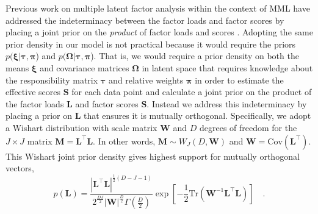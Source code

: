 \documentclass[twocolumn]{aastex62}
\newcommand{\todo}[1]{\textcolor{red}{#1}}
\newcommand{\vect}[1]{\boldsymbol{\mathbf{#1}}}
\renewcommand{\vec}[1]{\vect{#1}}
\newcommand{\weight}{\pi}
\newcommand{\data}{\textbf{Y}}
\newcommand{\vecdata}{\vec\data}
\newcommand{\diag}[1]{\textrm{diag}(#1)}
\newcommand{\transpose}{^\intercal}
\newcommand{\factorloads}{\textbf{L}}
\newcommand{\factorscores}{\textbf{S}}
\newcommand{\specificvariance}{\vec{D}}
\newcommand{\scoremeans}{\vec\xi}
\newcommand{\scorecovs}{\vec\Omega}
\newcommand{\NumDimensions}{D}
\newcommand{\NumLatentFactors}{J}
\newcommand{\likelihood}{\mathcal{L}}
\begin{document}
Previous work on multiple latent factor analysis within the context of MML have
addressed the indeterminacy between the factor loads and factor scores by
placing a joint prior on the \emph{product} of factor loads and scores \citep{WallaceMLF}.
Adopting the same prior density in our model is not practical because 
it would require the priors $p(\scoremeans|\vec\tau,\vec\weight$) and $p(\scorecovs|\vec\tau,\vec\weight$).
That is, we would require a prior density on both the means $\scoremeans$
and covariance matrices $\scorecovs$ in latent space that requires knowledge
about the responsibility matrix $\vec\tau$ and relative weights $\vec\weight$ in order to estimate the effective scores
$\factorscores$ for each data point and calculate a joint prior on the product
of the factor loads $\factorloads$ and factor scores $\factorscores$.
Instead we address this indeterminacy
by placing a prior on $\factorloads$ that ensures it is mutually orthogonal.
Specifically, we adopt a Wishart distribution with scale matrix $\vec{W}$
and $D$ degrees of freedom for the
$\NumLatentFactors\times\NumLatentFactors$ matrix $\vec{M} = \factorloads\transpose\factorloads$.
In other words, $\vec{M} \sim W_\NumLatentFactors(D,\vec{W})$
and $\vec{W} = \textrm{Cov}(\factorloads\transpose)$.
This
Wishart joint prior density gives highest support for mutually orthogonal vectors,
\begin{equation}
	p(\factorloads) = \frac{|\factorloads\transpose\factorloads|^{\frac{1}{2}(\NumDimensions - \NumLatentFactors - 1)}}{2^{\frac{\NumDimensions\NumLatentFactors}{2}}|\vec{W}|^{\frac{\NumDimensions}{2}}\Gamma(\frac{\NumDimensions}{2})}\exp\left[-\frac{1}{2}\textrm{Tr}(\vec{W}^{-1}\factorloads\transpose\factorloads)\right] \quad .
\end{equation}


\end{document}
